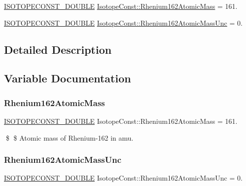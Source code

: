 \begin{DoxyCompactItemize}
\item 
\mbox{\hyperlink{group___isotope_const-_macros_ga8f45a7272ce02c0b4c65c44636ed719a}{I\+S\+O\+T\+O\+P\+E\+C\+O\+N\+S\+T\+\_\+\+D\+O\+U\+B\+LE}} \mbox{\hyperlink{group___isotope_const-_rhenium-_re162_ga2d31084667b33018cdec1ba561426244}{Isotope\+Const\+::\+Rhenium162\+Atomic\+Mass}} = 161.
\item 
\mbox{\hyperlink{group___isotope_const-_macros_ga8f45a7272ce02c0b4c65c44636ed719a}{I\+S\+O\+T\+O\+P\+E\+C\+O\+N\+S\+T\+\_\+\+D\+O\+U\+B\+LE}} \mbox{\hyperlink{group___isotope_const-_rhenium-_re162_ga169dd442135fa32414f4c6603e9fcd6a}{Isotope\+Const\+::\+Rhenium162\+Atomic\+Mass\+Unc}} = 0.
\end{DoxyCompactItemize}


\subsection{Detailed Description}


\subsection{Variable Documentation}
\mbox{\label{group___isotope_const-_rhenium-_re162_ga2d31084667b33018cdec1ba561426244}} 
\subsubsection{\texorpdfstring{Rhenium162\+Atomic\+Mass}{Rhenium162AtomicMass}}
{\footnotesize\ttfamily \mbox{\hyperlink{group___isotope_const-_macros_ga8f45a7272ce02c0b4c65c44636ed719a}{I\+S\+O\+T\+O\+P\+E\+C\+O\+N\+S\+T\+\_\+\+D\+O\+U\+B\+LE}} Isotope\+Const\+::\+Rhenium162\+Atomic\+Mass = 161.}

\$ \$ Atomic mass of Rhenium-\/162 in amu. \mbox{\label{group___isotope_const-_rhenium-_re162_ga169dd442135fa32414f4c6603e9fcd6a}} 
\subsubsection{\texorpdfstring{Rhenium162\+Atomic\+Mass\+Unc}{Rhenium162AtomicMassUnc}}
{\footnotesize\ttfamily \mbox{\hyperlink{group___isotope_const-_macros_ga8f45a7272ce02c0b4c65c44636ed719a}{I\+S\+O\+T\+O\+P\+E\+C\+O\+N\+S\+T\+\_\+\+D\+O\+U\+B\+LE}} Isotope\+Const\+::\+Rhenium162\+Atomic\+Mass\+Unc = 0.}

